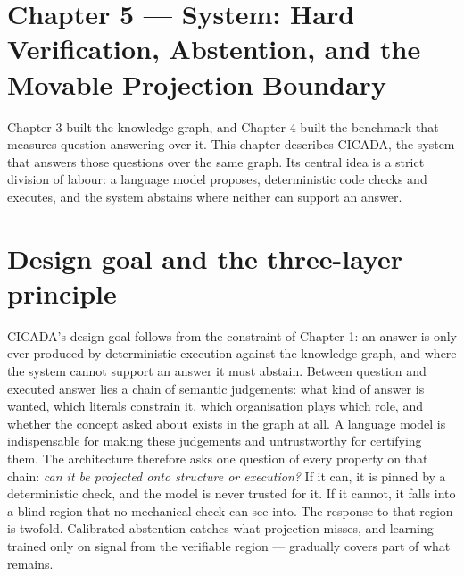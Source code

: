 \section{Chapter 5 --- System: Hard Verification, Abstention, and the Movable Projection Boundary}\label{sec:chapter-5-system-hard-verification-abste}

Chapter 3 built the knowledge graph, and Chapter 4 built the benchmark that measures question answering over it. This chapter describes CICADA, the system that answers those questions over the same graph. Its central idea is a strict division of labour: a language model proposes, deterministic code checks and executes, and the system abstains where neither can support an answer.

\section{Design goal and the three-layer principle}\label{sec:design-goal-and-the-three-layer-principl}

CICADA's design goal follows from the constraint of Chapter 1: an answer is only ever produced by deterministic execution against the knowledge graph, and where the system cannot support an answer it must abstain. Between question and executed answer lies a chain of semantic judgements: what kind of answer is wanted, which literals constrain it, which organisation plays which role, and whether the concept asked about exists in the graph at all. A language model is indispensable for making these judgements and untrustworthy for certifying them. The architecture therefore asks one question of every property on that chain: \emph{can it be projected onto structure or execution?} If it can, it is pinned by a deterministic check, and the model is never trusted for it. If it cannot, it falls into a blind region that no mechanical check can see into. The response to that region is twofold. Calibrated abstention catches what projection misses, and learning --- trained only on signal from the verifiable region --- gradually covers part of what remains.

